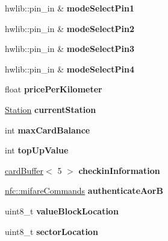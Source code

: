 \begin{DoxyCompactItemize}
hwlib\+::pin\+\_\+in \& {\bfseries mode\+Select\+Pin1}
\item 
\mbox{\label{classovTracker_a04a495f34e3243b4ebc9272064b3b36f}} 
hwlib\+::pin\+\_\+in \& {\bfseries mode\+Select\+Pin2}
\item 
\mbox{\label{classovTracker_af926ce19d3d8255d8381d40667daadf4}} 
hwlib\+::pin\+\_\+in \& {\bfseries mode\+Select\+Pin3}
\item 
\mbox{\label{classovTracker_a31257c543ea254fe6e96577b3c87ba67}} 
hwlib\+::pin\+\_\+in \& {\bfseries mode\+Select\+Pin4}
\item 
\mbox{\label{classovTracker_aad4c6b519039c0ecc815b6fd75673f5f}} 
float {\bfseries price\+Per\+Kilometer}
\item 
\mbox{\label{classovTracker_a3809e7cc2aa16b949aeb81419968eb93}} 
\hyperlink{structStation}{Station} {\bfseries current\+Station}
\item 
\mbox{\label{classovTracker_a1c03a3f4be04f3e784b29ef61659196b}} 
int {\bfseries max\+Card\+Balance}
\item 
\mbox{\label{classovTracker_ae5f9b9f586c245169ad4d619e4c49883}} 
int {\bfseries top\+Up\+Value}
\item 
\mbox{\label{classovTracker_a252a1cc6045b50f7bed06d11f1f3dcc5}} 
\hyperlink{structcardBuffer}{card\+Buffer}$<$ 5 $>$ {\bfseries checkin\+Information}
\item 
\mbox{\label{classovTracker_a94d61e2af33a9eff4e315a945d7c5db9}} 
\hyperlink{declarations_8h_a305b1a3bcfca65e2a82f0f9d24676835}{nfc\+::mifare\+Commands} {\bfseries authenticate\+AorB}
\item 
\mbox{\label{classovTracker_afba6265508b4b0d1556cb5ce23183607}} 
uint8\+\_\+t {\bfseries value\+Block\+Location}
\item 
\mbox{\label{classovTracker_a5a9b2a6df28a17ff22d5b9eebaff68c9}} 
uint8\+\_\+t {\bfseries sector\+Location}
\end{DoxyCompactItemize}


